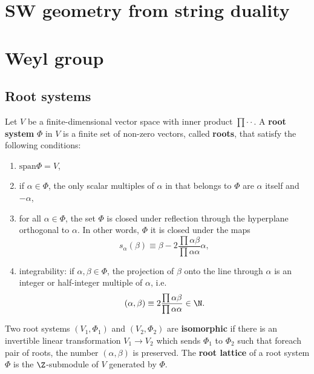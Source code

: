 \documentclass{worksheetclass}
\renewcommand{\emph}{\textbf}
\begin{document}
\section{SW geometry from string duality}

\appendix

\section{Weyl group}

    \subsection{Root systems}

        Let $V$ be a finite-dimensional vector space with inner product $\prod{\cdot}{\cdot}$. A \emph{root system} $\Phi$ in $V$ is a finite set of non-zero vectors, called \emph{roots}, that satisfy the following conditions:
        \begin{enumerate}
            \item $\text{span}\Phi=V$,
            \item if $\alpha\in\Phi$, the only scalar multiples of $\alpha$ in that belongs to $\Phi$ are $\alpha$ itself and $-\alpha$,
            \item for all $\alpha\in\Phi$, the set $\Phi$ is closed under reflection through the hyperplane orthogonal to $\alpha$. In other words, $\Phi$ it is closed under the maps
            \begin{equation}
                s_\alpha(\beta)\equiv\beta-2\frac{\prod{\alpha}{\beta}}{\prod{\alpha}{\alpha}}\alpha,
            \end{equation}
            \item integrability: if $\alpha,\beta\in\Phi$, the projection of $\beta$ onto the line through $\alpha$ is an integer or half-integer multiple of $\alpha$, i.e.
            \begin{equation}
                (\alpha,\beta)\equiv 2\frac{\prod{\alpha}{\beta}}{\prod{\alpha}{\alpha}}\in\N.
            \end{equation}
        \end{enumerate}
        Two root systems $(V_1,\Phi_1)$ and $(V_2,\Phi_2)$ are \emph{isomorphic} if there is an invertible linear transformation $V_1\to V_2$ which sends $\Phi_1$ to $\Phi_2$ such that foreach pair of roots, the number $(\alpha,\beta)$ is preserved. The \emph{root lattice} of a root system $\Phi$ is the $\Z$-submodule of $V$ generated by $\Phi$.
\end{document}

